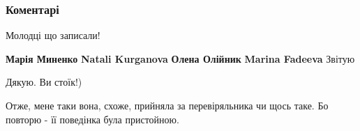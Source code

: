  
 
 
 
 
\subsubsection{Коментарі}

\begin{itemize}
 
Молодці що записали!

 
\textbf{Марія Миненко} \textbf{Natali Kurganova} \textbf{Олена Олійник} \textbf{Marina Fadeeva}
Звітую


\begin{itemize}
 
Дякую. Ви стоїк!)

 
Отже, мене таки вона, схоже, прийняла за перевіряльника чи щось таке. Бо повторю - її поведінка була пристойною.
\end{itemize}

 

\end{itemize}
